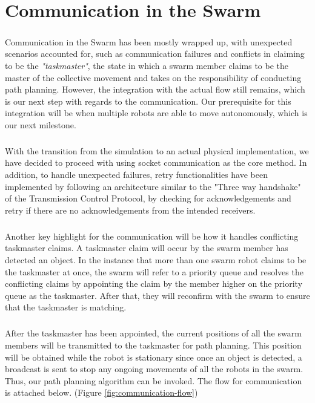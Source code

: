 \chapter{Communication in the Swarm}

\paragraph*{}
Communication in the Swarm has been mostly wrapped up, with unexpected scenarios accounted for, such as communication failures and conflicts in claiming to be the \textit{"taskmaster"}, the state in which a swarm member claims to be the master of the collective movement and takes on the responsibility of conducting path planning. However, the integration with the actual flow still remains, which is our next step with regards to the communication. Our prerequisite for this integration will be when multiple robots are able to move autonomously, which is our next milestone.

\paragraph*{}
With the transition from the simulation to an actual physical implementation, we have decided to proceed with using socket communication as the core method. In addition, to handle unexpected failures, retry functionalities have been implemented by following an architecture similar to the "Three way handshake" of the Transmission Control Protocol, by checking for acknowledgements and retry if there are no acknowledgements from the intended receivers.

\paragraph*{}
Another key highlight for the communication will be how it handles conflicting taskmaster claims. A taskmaster claim will occur by the swarm member has detected an object. In the instance that more than one swarm robot claims to be the taskmaster at once, the swarm will refer to a priority queue and resolves the conflicting claims by appointing the claim by the member higher on the priority queue as the taskmaster. After that, they will reconfirm with the swarm to ensure that the taskmaster is matching.

\paragraph*{}
After the taskmaster has been appointed, the current positions of all the swarm members will be transmitted to the taskmaster for path planning. This position will be obtained while the robot is stationary since once an object is detected, a broadcast is sent to stop any ongoing movements of all the robots in the swarm. Thus, our path planning algorithm can be invoked. The flow for communication is attached below. (Figure \ref{fig:communication-flow})

